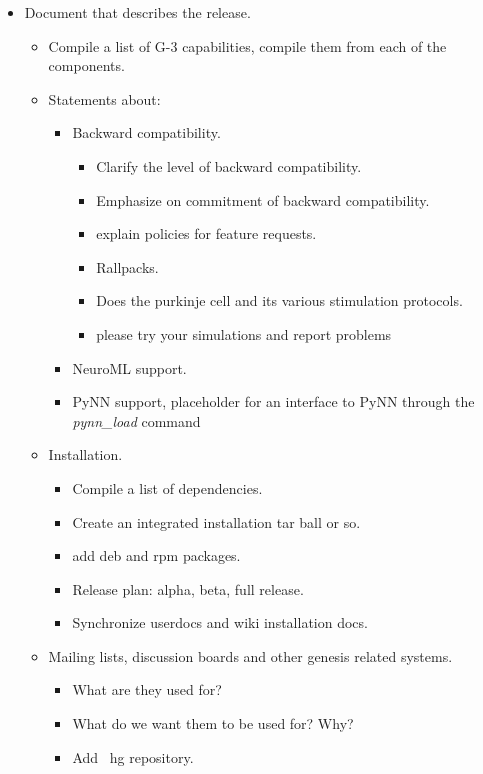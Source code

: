 \documentclass[12pt]{article}
\begin{document}
\begin{itemize}
\item Document that describes the release.
  \begin{itemize}
  \item Compile a list of G-3 capabilities, compile them from each of the components.
  \item Statements about:
    \begin{itemize}
    \item Backward compatibility.
      \begin{itemize}
      \item Clarify the level of backward compatibility. 
      \item Emphasize on commitment of backward compatibility.
      \item explain policies for feature requests.
      \item Rallpacks.
      \item Does the purkinje cell and its various stimulation protocols.
      \item please try your simulations and report problems
      \end{itemize}
    \item NeuroML support.
    \item PyNN support, placeholder for an interface to PyNN through the
      {\it pynn\_load} command
    \end{itemize}
  \item Installation.
    \begin{itemize}
    \item Compile a list of dependencies.
    \item Create an integrated installation tar ball or so.
    \item add deb and rpm packages.
    \item Release plan: alpha, beta, full release.
    \item Synchronize userdocs and wiki installation docs.
    \end{itemize}
  \item Mailing lists, discussion boards and other genesis related systems.
    \begin{itemize}
    \item What are they used for?
    \item What do we want them to be used for? Why?
    \item Add {\ hg} repository.

\end{itemize}
\end{itemize}
\end{itemize}
\end{document}
